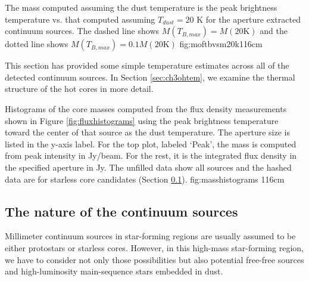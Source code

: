 \documentclass{emulateapj}
\begin{document}
{The mass computed assuming the dust temperature is the peak brightness
temperature vs. that computed assuming $T_{dust}=20$ K  for the aperture extracted
continuum sources.
The dashed line shows $M(T_{B,max}) =
M(20\textrm{K})$ and the dotted line shows $M(T_{B,max}) = 0.1 
M(20\textrm{K})$ 
}{fig:moftbvsm20k}{1}{16cm}

This section has provided some simple temperature estimates across all of the
detected continuum sources.  In Section \ref{sec:ch3ohtem}, we  examine
the thermal structure of the hot cores in more detail.



{Histograms of the core masses computed from the flux density measurements
shown in Figure \ref{fig:fluxhistograms} using the peak brightness temperature 
toward the center of that source as the dust temperature.
The aperture size is listed in the y-axis label.  For the top plot, labeled
`Peak', the mass is computed from peak
intensity in Jy/beam.  For the rest, it is the integrated flux density in
the specified aperture in Jy.  The unfilled data show all sources and the
hashed
data are for starless core candidates (Section \ref{sec:contsourcenature}).}
{fig:masshistograms}
{1}{16cm}

\subsection{The nature of the continuum sources}
\label{sec:contsourcenature}
Millimeter continuum sources in star-forming regions are usually assumed to be
either protostars or starless cores.  However, in this high-mass star-forming
region, we have to consider not only those possibilities but also potential
free-free sources and high-luminosity main-sequence stars embedded in dust.
\end{document}
